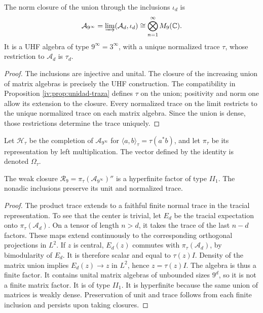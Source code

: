\begin{theorem}
\label{iv:thm:uhf}
The norm closure of the union through the inclusions \(\iota_d\)
is
\[
 \mathcal A_{9^\infty}
 =\varinjlim(\mathcal A_d,\iota_d)
 \cong\bigotimes_{n=1}^{\infty}M_9(\mathbb C).
\]
It is a UHF algebra of type \(9^\infty=3^\infty\), with a unique
normalized trace \(\tau\), whose restriction to \(\mathcal A_d\)
is \(\tau_d\).
\end{theorem}
\begin{proof}
The inclusions are injective and unital. The closure of the increasing
union of matrix algebras is precisely the UHF construction.
The compatibility in Proposition \ref{iv:prop:unidad-traza}
defines \(\tau\) on the union; positivity and norm one allow
its extension to the closure. Every normalized trace on the limit restricts
to the unique normalized trace on each matrix algebra. Since the union
is dense, those restrictions determine the trace uniquely.
\end{proof}

Let \(\mathcal H_\tau\) be the completion of
\(\mathcal A_{9^\infty}\) for
\(\langle a,b\rangle_\tau=\tau(a^*b)\), and let \(\pi_\tau\)
be its representation by left multiplication. The vector defined
by the identity is denoted \(\Omega_\tau\).

\begin{theorem}
\label{iv:thm:factor-tracial}
The weak closure
\(\mathcal R_9=\pi_\tau(\mathcal A_{9^\infty})''\)
is a hyperfinite factor of type \(II_1\). The nonadic
inclusions preserve its unit and normalized trace.
\end{theorem}
\begin{proof}
The product trace extends to a faithful finite normal trace
in the tracial representation. To see that the center is trivial,
let \(E_d\) be the tracial expectation onto \(\pi_\tau(\mathcal A_d)\).
On a tensor of length \(n>d\), it takes the trace of the last
\(n-d\) factors. These maps extend continuously
to the corresponding orthogonal projections in \(L^2\).
If \(z\) is central, \(E_d(z)\) commutes with
\(\pi_\tau(\mathcal A_d)\), by bimodularity of \(E_d\).
It is therefore scalar and equal to \(\tau(z)I\). Density of the
matrix union implies \(E_d(z)\to z\) in \(L^2\), hence
\(z=\tau(z)I\). The algebra is thus a finite factor.
It contains unital matrix algebras of unbounded sizes \(9^d\),
so it is not a finite matrix factor. It is of type \(II_1\).
It is hyperfinite because the same union of matrices is weakly
dense. Preservation of unit and trace follows from each finite
inclusion and persists upon taking closures.
\end{proof}


